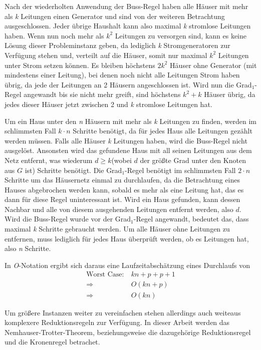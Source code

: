 Nach der wiederholten Anwendung der Buss-Regel haben alle Häuser mit mehr als \emph{k} Leitungen einen Generator und sind von der weiteren Betrachtung ausgeschlossen. Jeder übrige Haushalt kann also maximal \emph{k} stromlose Leitungen haben. Wenn nun noch mehr als $k^{2}$ Leitungen zu versorgen sind, kann es keine Lösung dieser Probleminstanz geben, da lediglich \emph{k} Stromgeneratoren zur Verfügung stehen und, verteilt auf die Häuser, somit nur maximal $k^{2}$ Leitungen unter Strom setzen können. Es bleiben höchstens $2 k^{2}$ Häuser ohne Generator (mit mindestens einer Leitung), bei denen noch nicht alle Leitungen Strom haben übrig\cite{param}, da jede der Leitungen an 2 Häusern angeschlossen ist. Wird nun die Grad$_{1}$-Regel angewandt bis sie nicht mehr greift, sind höchstens $k^{2} + k$ Häuser übrig, da jedes dieser Häuser jetzt zwischen 2 und \emph{k} stromlose Leitungen hat.


Um ein Haus unter den \emph{n} Häusern mit mehr als \emph{k} Leitungen zu finden, werden im schlimmsten Fall $k \cdot n$ Schritte benötigt, da für jedes Haus alle Leitungen gezählt werden müssen. Falls alle Häuser \emph{k} Leitungen haben, wird die Buss-Regel nicht ausgelöst. Ansonsten wird das gefundene Haus mit all seinen Leitungen aus dem Netz entfernt, was wiederum $d \geq k$(wobei $d$ der größte Grad unter den Knoten aus $G$ ist) Schritte benötigt. Die Grad$_{1}$-Regel benötigt im schlimmsten Fall $2 \cdot n$ Schritte um das Häusernetz einmal zu durchlaufen, da die Betrachtung eines Hauses abgebrochen werden kann, sobald es mehr als eine Leitung hat, das es dann für diese Regel uninteressant ist. Wird ein Haus gefunden, kann dessen Nachbar und alle von diesem ausgehenden Leitungen entfernt werden, also $d$. Wird die Buss-Regel wurde vor der Grad$_{1}$-Regel angewandt, bedeutet das, dass maximal \emph{k} Schritte gebraucht werden. Um alle Häuser ohne Leitungen zu entfernen, muss lediglich für jedes Haus überprüft werden, ob es Leitungen hat, also \emph{n} Schritte.




In \emph{O}-Notation ergibt sich daraus eine Laufzeitabschätzung eines Durchlaufs von
\begin{align}
\text{Worst Case}:\ & kn + p + p + 1\\
\Rightarrow\ & O(kn + p)\\
\Rightarrow\ & O(kn)
\end{align}

Um größere Instanzen weiter zu vereinfachen stehen allerdings auch weiteaus komplexere Reduktionsregeln zur Verfügung. In dieser Arbeit werden das Nemhauser-Trotter-Theorem, beziehungsweise die dazugehörige Reduktionsregel und die Kronenregel betrachet.




